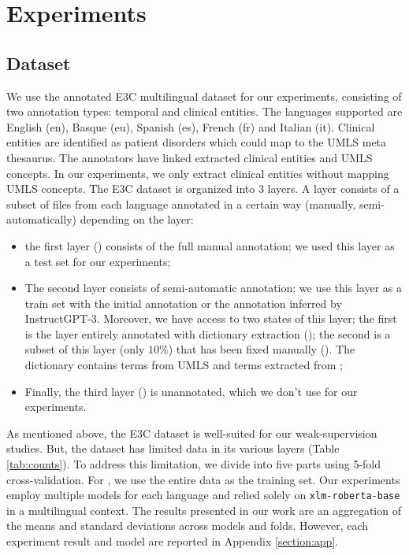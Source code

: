 \section{Experiments}
\subsection{Dataset}
We use the annotated E3C multilingual dataset \citep{Magnini2020TheCases} for our experiments, consisting of two annotation types: temporal and clinical entities. The languages supported are English (en), Basque (eu), Spanish (es), French (fr) and Italian (it). Clinical entities are identified as patient disorders which could map to the UMLS meta thesaurus. The annotators have linked extracted clinical entities and UMLS concepts. In our experiments, we only extract clinical entities without mapping UMLS concepts. 
The E3C dataset is organized into 3 layers. A layer consists of a subset of files from each language annotated in a certain way (manually, semi-automatically) depending on the layer:
\begin{itemize}
    \item the first layer (\layerOne) consists of the full manual annotation; we used this layer as a test set for our experiments;
    \item The second layer consists of semi-automatic annotation; we use this layer as a train set with the initial annotation or the annotation inferred by InstructGPT-3. Moreover, we have access to two states of this layer; the first is the layer entirely annotated with dictionary extraction (\layerTwo); the second is a subset of this layer (only $10\%$) that has been fixed manually (\layerValidate). The dictionary contains terms from UMLS and terms extracted from \layerOne;
    \item Finally, the third layer (\layerThree) is unannotated, which we don't use for our experiments.
\end{itemize}

As mentioned above, the E3C dataset is well-suited for our weak-supervision studies. But, the dataset has limited data in its various layers (Table \ref{tab:counts}). To address this limitation, we divide \layerTwo into five parts using 5-fold cross-validation. For \layerValidate, we use the entire data as the training set. Our experiments employ multiple models for each language and relied solely on \verb|xlm-roberta-base| in a multilingual context. The results presented in our work are an aggregation of the means and standard deviations across models and folds.
However, each experiment result and model are reported in Appendix \ref{section:app}.

